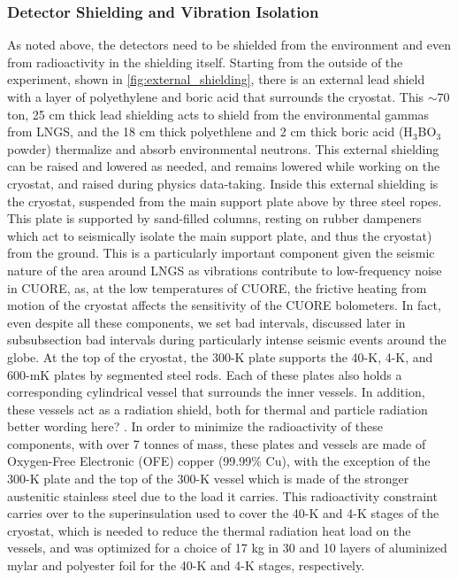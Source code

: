 \subsubsection*{Detector Shielding and Vibration Isolation}
As noted above, the detectors need to be shielded from the environment and even from radioactivity in the shielding itself.
Starting from the outside of the experiment, shown in \autoref{fig:external_shielding}, there is an external lead shield with a layer of polyethylene and boric acid that surrounds the cryostat.
This $\sim70$ ton, 25 cm thick lead shielding acts to shield from the environmental gammas from LNGS, and the 18 cm thick polyethlene and 2 cm thick boric acid (H$_3$BO$_3$ powder) thermalize and absorb environmental neutrons.
This external shielding can be raised and lowered as needed, and remains lowered while working on the cryostat, and raised during physics data-taking.
Inside this external shielding is the cryostat, suspended from the main support plate above by three steel ropes.
This plate is supported by sand-filled columns, resting on rubber dampeners which act to seismically isolate the main support plate, and thus the cryostat) from the ground.
This is a particularly important component given the seismic nature of the area around LNGS as vibrations contribute to low-frequency noise in CUORE, as, at the low temperatures of CUORE, the frictive heating from motion of the cryostat affects the sensitivity of the CUORE bolometers.
In fact, even despite all these components, we set bad intervals, \color{red} discussed later in subsubsection bad intervals \color{black} during particularly intense seismic events around the globe.
At the top of the cryostat, the 300-K plate supports the 40-K, 4-K, and 600-mK plates by segmented steel rods.
Each of these plates also holds a corresponding cylindrical vessel that surrounds the inner vessels.
In addition, these vessels act as a radiation shield, both for thermal and particle radiation \color{red} better wording here? \color{black}.
In order to minimize the radioactivity of these components, with over 7 tonnes of mass, these plates and vessels are made of Oxygen-Free Electronic (OFE) copper (99.99\% Cu), with the exception of the 300-K plate and the top of the 300-K vessel which is made of the stronger austenitic stainless steel due to the load it carries. This radioactivity constraint carries over to the superinsulation used to cover the 40-K and 4-K stages of the cryostat, which is needed to reduce the thermal radiation heat load on the vessels, and was optimized for a choice of 17 kg in 30 and 10 layers of aluminized mylar and polyester foil for the 40-K and 4-K stages, respectively.


